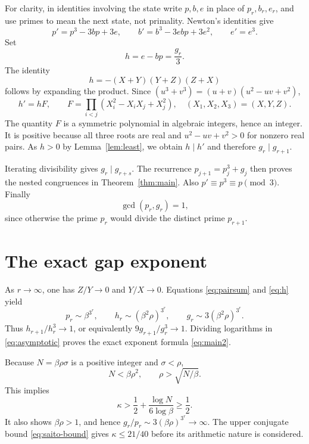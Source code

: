 \documentclass[11pt,a4paper]{article}
\theoremstyle{definition}\newtheorem{definition}[theorem]{Definition}
\theoremstyle{remark}\newtheorem{remark}[theorem]{Remark}
\begin{document}
For clarity, in identities involving the state write $p,b,e$ in place of $p_r,b_r,e_r$, and use primes to mean the next state, not primality. Newton's identities give
\begin{equation}\label{eq:state}
 p'=p^3-3bp+3e,\qquad b'=b^3-3ebp+3e^2,\qquad e'=e^3.
\end{equation}
Set
\begin{equation}\label{eq:h}
 h=e-bp=\frac{g_r}{3}.
\end{equation}
The identity
\begin{equation}\label{eq:pairsum}
 h=-(X+Y)(Y+Z)(Z+X)
\end{equation}
follows by expanding the product. Since $(u^3+v^3)=(u+v)(u^2-uv+v^2)$,
\begin{equation}\label{eq:F}
 h'=hF,
 \qquad F=\prod_{i<j}(X_i^2-X_iX_j+X_j^2),
 \quad (X_1,X_2,X_3)=(X,Y,Z).
\end{equation}
The quantity $F$ is a symmetric polynomial in algebraic integers, hence an integer. It is positive because all three roots are real and $u^2-uv+v^2>0$ for nonzero real pairs. As $h>0$ by Lemma~\ref{lem:least}, we obtain $h\mid h'$ and therefore $g_r\mid g_{r+1}$.

Iterating divisibility gives $g_r\mid g_{r+s}$. The recurrence $p_{j+1}=p_j^3+g_j$ then proves the nested congruences in Theorem~\ref{thm:main}. Also $p'\equiv p^3\equiv p\pmod3$. Finally
\begin{equation}\label{eq:gcd}
 \gcd(p_r,g_r)=1,
\end{equation}
since otherwise the prime $p_r$ would divide the distinct prime $p_{r+1}$.

\section{The exact gap exponent}
As $r\to\infty$, one has $Z/Y\to0$ and $Y/X\to0$. Equations \eqref{eq:pairsum} and \eqref{eq:h} yield
\begin{equation}\label{eq:asymptotic}
 p_r\sim\beta^{3^r},\qquad
 h_r\sim(\beta^2\rho)^{3^r},\qquad
 g_r\sim3(\beta^2\rho)^{3^r}.
\end{equation}
Thus $h_{r+1}/h_r^3\to1$, or equivalently $9g_{r+1}/g_r^3\to1$. Dividing logarithms in \eqref{eq:asymptotic} proves the exact exponent formula \eqref{eq:main2}.

Because $N=\beta\rho\sigma$ is a positive integer and $\sigma<\rho$,
\[
 N<\beta\rho^2,\qquad
 \rho>\sqrt{N/\beta}.
\]
This implies
\[
 \kappa>\frac12+\frac{\log N}{6\log\beta}\ge\frac12.
\]
It also shows $\beta\rho>1$, and hence $g_r/p_r\sim3(\beta\rho)^{3^r}\to\infty$. The upper conjugate bound \eqref{eq:saito-bound} gives $\kappa\le21/40$ before its arithmetic nature is considered.
\end{document}
